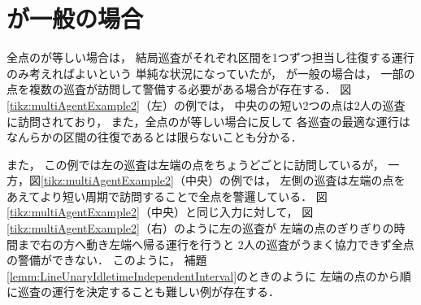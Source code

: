 \section{{\maxIdletime}が一般の場合}
\label{theo:LineArbitraryIdletime}

全点の{\maxIdletime}が等しい場合は，
結局巡査がそれぞれ区間を1つずつ担当し往復する運行のみ考えればよいという
単純な状況になっていたが，
{\maxIdletime}が一般の場合は，
一部の点を複数の巡査が訪問して警備する必要がある場合が存在する．
%
図\ref{tikz:multiAgentExample2}（左）の例では，
中央の{\maxIdletime}の短い2つの点は$2$人の巡査に訪問されており，
また，全点の{\maxIdletime}が等しい場合に反して
各巡査の最適な運行はなんらかの区間の往復であるとは限らないことも分かる．


また，
この例では左の巡査は左端の点を{\maxIdletime}ちょうどごとに訪問しているが，
一方，図\ref{tikz:multiAgentExample2}（中央）の例では，
左側の巡査は左端の点をあえてより短い周期で訪問することで全点を警邏している．
図\ref{tikz:multiAgentExample2}（中央）と同じ入力に対して，
図\ref{tikz:multiAgentExample2}（右）のように左の巡査が
左端の点の{\maxIdletime}ぎりぎりの時間まで右の方へ動き左端へ帰る運行を行うと
$2$人の巡査がうまく協力できず全点の警備ができない．
このように，
補題\ref{lemm:LineUnaryIdletimeIndependentInterval}のときのように
左端の点の{\maxIdletime}から順に巡査の運行を決定することも難しい例が存在する．

